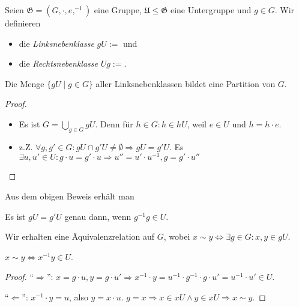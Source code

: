 \begin{definition}
    Seien $\mathfrak{G} = (G, \cdot, e, ^{-1})$ eine Gruppe, $\mathfrak{U} \le \mathfrak{G}$ eine Untergruppe und $g \in G$. Wir definieren 
    \begin{itemize}[topsep=0cm, label={--}]
        \item die \emph{Linksnebenklasse} $gU := {}$ und
        \item die \emph{Rechtsnebenklasse} $Ug := {}$. %
    \end{itemize}
\end{definition}

\begin{lemma}
    Die Menge $\{gU \mid g \in G\}$ aller Linksnebenklassen bildet eine Partition von $G$.
\end{lemma}
\begin{proof}\phantom{.}
    \begin{itemize}
        \item Es ist $G = \bigcup_{g \in G} gU$. Denn für $h \in G: h \in hU$, weil $e \in U$ und $h = h \cdot e$.
        \item z.Z. $\forall g, g' \in G: gU \cap g'U \not= \emptyset \Rightarrow gU = g'U$. Es $\exists u, u' \in U: g\cdot u = g'\cdot u \Rightarrow u'' = u' \cdot u^{-1}, g = g' \cdot u''$ 
    \end{itemize}
    
\end{proof}

Aus dem obigen Beweis erhält man 
\begin{corollary}
    Es ist $gU = g'U$ genau dann, wenn $g^{-1}g \in U$.
\end{corollary}

\begin{corollary}
    Wir erhalten eine Äquivalenzrelation auf $G$, wobei $x \sim y \Leftrightarrow \exists g \in G: x,y \in gU$.
\end{corollary}

\begin{lemma}
    $x \sim y \Leftrightarrow x^{-1}y \in U$. 
\end{lemma}
\begin{proof}
    ``$\Rightarrow$'': $x = g\cdot u, y = g\cdot u' \Rightarrow x^{-1}\cdot y = u^{-1}\cdot g^{-1} \cdot g \cdot u' = u^{-1} \cdot u' \in U$.

    ``$\Leftarrow$'': $x^{-1}\cdot y = u$, also $y = x\cdot u$. $g = x \Rightarrow x \in xU \land y \in xU \Rightarrow x \sim y$. 
\end{proof}

